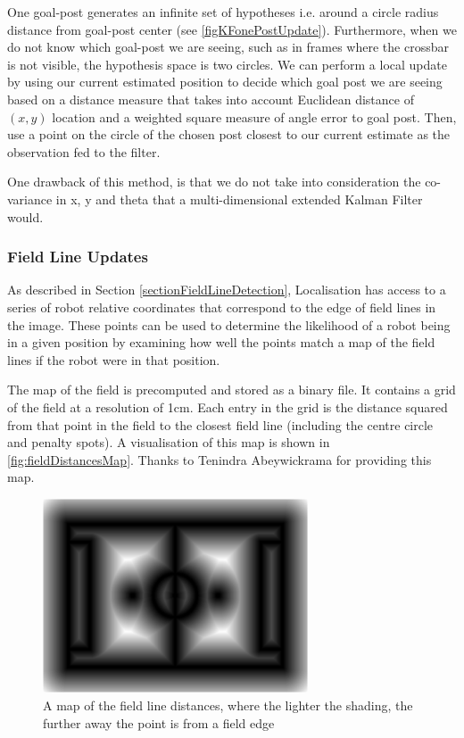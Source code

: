 \documentclass[pdftex,11pt,a4paper]{report}
\begin{document}
One goal-post generates an infinite set of hypotheses i.e. around a circle radius distance from goal-post center (see \autoref{figKFonePostUpdate}). Furthermore, when we do not know which goal-post we are seeing, such as in frames where the crossbar is not visible, the hypothesis space is two circles. We can perform a local update by using our current estimated position to decide which goal post we are seeing based on a distance measure that takes into account Euclidean distance of $(x, y)$ location and a weighted square measure of angle error to goal post. Then, use a point on the circle of the chosen post closest to our current estimate as the observation fed to the filter.

One drawback of this method, is that we do not take into consideration the co-variance in x, y and theta that a multi-dimensional extended Kalman Filter would.

\subsubsection{Field Line Updates} \label{sectionFieldLineUpdates}

As described in Section \ref{sectionFieldLineDetection}, Localisation has access to a series of robot relative coordinates that correspond to the edge of field lines in the image. These points can be used to determine the likelihood of a robot being in a given position by examining how well the points match a map of the field lines if the robot were in that position.

The map of the field is precomputed and stored as a binary file. It contains a grid of the field at a resolution of 1cm. Each entry in the grid is the distance squared from that point in the field to the closest field line (including the centre circle and penalty spots). A visualisation of this map is shown in \autoref{fig:fieldDistancesMap}. Thanks to Tenindra Abeywickrama for providing this map.

\begin{figure} [t]
\centering
\includegraphics[width=0.7\textwidth]{figures/fieldDistancesMap.png}
\caption{A map of the field line distances, where the lighter the shading, the further away the point is from a field edge} \label{fig:fieldDistancesMap}
\end{figure}
\end{document}
